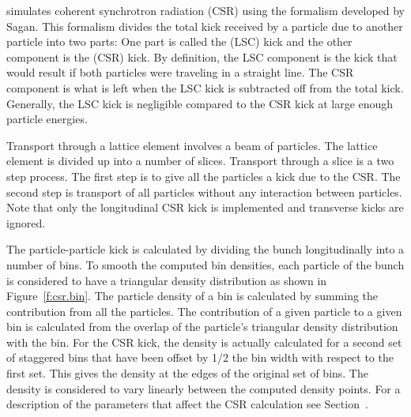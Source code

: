 \bmad simulates coherent synchrotron radiation (CSR) using the
formalism developed by Sagan\cite{b:csr}.  This formalism divides the
total kick received by a particle due to another particle into two
parts: One part is called the  (LSC)
kick and the other component is the  (CSR) kick. By definition, the LSC component is the
kick that would result if both particles were traveling in a straight
line. The CSR component is what is left when the LSC kick is
subtracted off from the total kick. Generally, the LSC kick is
negligible compared to the CSR kick at large enough particle energies.

Transport through a lattice element involves a beam of particles. The
lattice element is divided up into a number of slices. Transport
through a slice is a two step process.  The first step is to give all
the particles a kick due to the CSR. The second step is transport of
all particles without any interaction between particles. Note that
only the longitudinal CSR kick is implemented and transverse kicks are
ignored.

The particle-particle kick is calculated by dividing the bunch
longitudinally into a number of bins. To smooth the computed bin
densities, each particle of the bunch is considered to have a
triangular density distribution as shown in Figure~\ref{f:csr.bin}.
The particle density of a bin is calculated by summing the
contribution from all the particles. The contribution of a given
particle to a given bin is calculated from the overlap of the
particle's triangular density distribution with the bin. For the CSR
kick, the density is actually calculated for a second set of staggered
bins that have been offset by 1/2 the bin width with respect to the
first set. This gives the density at the edges of the original set of
bins. The density is considered to vary linearly between the computed
density points. For a description of the parameters that affect the
CSR calculation see Section~.
 
